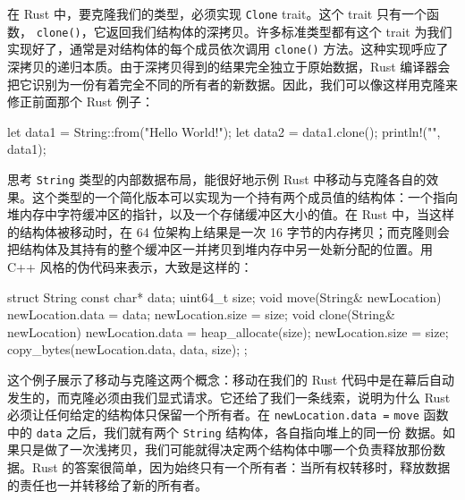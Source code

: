 在 Rust 中，要克隆我们的类型，必须实现 \texttt{Clone} trait。这个 trait 只有一个函数，
\texttt{clone()}，它返回我们结构体的深拷贝。许多标准类型都有这个 trait
为我们实现好了，通常是对结构体的每个成员依次调用 \texttt{clone()} 方法。这种实现呼应了深拷贝的递归本质。由于深拷贝得到的结果完全独立于原始数据，Rust 编译器会把它识别为一份有着完全不同的所有者的新数据。因此，我们可以像这样用克隆来修正前面那个 Rust 例子：
\begin{codebox}[rust]
let data1 = String::from("Hello World!");
let data2 = data1.clone();
println!("{}", data1);
\end{codebox}
\label{idx:idx_94eb5ca6}
思考 \texttt{String} 类型的内部数据布局，能很好地示例 Rust 中移动与克隆各自的效果。这个类型的一个简化版本可以实现为一个持有两个成员值的结构体：一个指向堆内存中字符缓冲区的指针，以及一个存储缓冲区大小的值。在 Rust 中，当这样的结构体被移动时，在 64 位架构上结果是一次 16 字节的内存拷贝；而克隆则会把结构体及其持有的整个缓冲区一并拷贝到堆内存中另一处新分配的位置。用 C++ 风格的伪代码来表示，大致是这样的：
\begin{codebox}[rust]
struct String {
    const char* data;
    uint64_t size;
    void move(String& newLocation) {
        newLocation.data = data;
        newLocation.size = size;
    }
    void clone(String& newLocation) {
        newLocation.data = heap_allocate(size);
        newLocation.size = size;
        copy_bytes(newLocation.data, data, size);
    }
};
\end{codebox}
这个例子展示了移动与克隆这两个概念：移动在我们的 Rust 代码中是在幕后自动发生的，而克隆必须由我们显式请求。它还给了我们一条线索，说明为什么 Rust 必须让任何给定的结构体只保留一个所有者。在 \texttt{newLocation.\allowbreak{}data =\allowbreak{}}
\label{idx:idx_d564bbf9}
\texttt{move} 函数中的 \texttt{data} 之后，我们就有两个 \texttt{String} 结构体，各自指向堆上的同一份
数据。如果只是做了一次浅拷贝，我们可能就得决定两个结构体中哪一个负责释放那份数据。Rust 的答案很简单，因为始终只有一个所有者：当所有权转移时，释放数据的责任也一并转移给了新的所有者。
